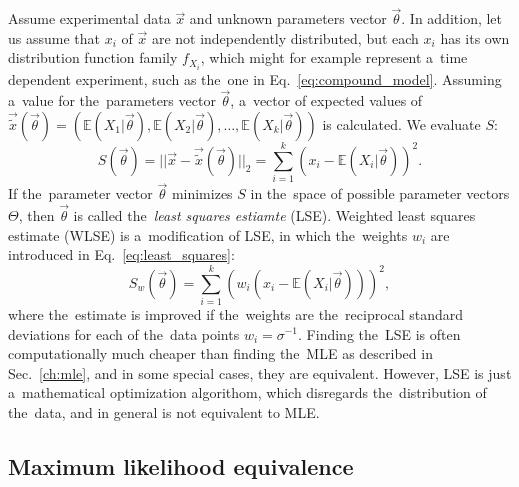 Assume experimental data $\vec{x}$ and unknown parameters vector $\vec{\theta}$. In addition, let us assume that $x_i$ of $\vec{x}$ are not independently distributed, but each $x_i$ has its own distribution function family $f_{X_i}$, which might for example represent a~time dependent experiment, such as the~one in Eq.~\ref{eq:compound_model}. Assuming a~value for the~parameters vector $\vec{{\theta}}$, a~vector of expected values of $\vec{\tilde{x}}(\vec{{\theta}}) = (\mathbb{E}(X_1|\vec{\theta}),\mathbb{E}(X_2|\vec{\theta}),\dots,\mathbb{E}(X_k|\vec{\theta}))$ is calculated. We evaluate $S$:
\begin{equation}
    S(\vec{{\theta}}) = || \vec{x} - \vec{\tilde{x}}(\vec{{\theta}}) ||_2 = \sum_{i=1}^{k} \left( x_i - \mathbb{E}(X_i|\vec{\theta}) \right)^2. \label{eq:least_squares}
\end{equation}
If the~parameter vector $\vec{{\theta}}$ minimizes $S$ in the~space of possible parameter vectors $\Theta$, then $\vec{{\theta}}$ is called the~\textit{least squares estiamte} (LSE). Weighted least squares estimate (WLSE) is a~modification of LSE, in which the~weights $w_i$ are introduced in Eq.~\ref{eq:least_squares}:
\begin{equation}
     S_w(\vec{{\theta}}) = \sum_{i=1}^{k} \left( w_i \left( x_i - \mathbb{E}(X_i|\vec{\theta}) \right) \right)^2, \label{eq:weighted_least_squares}
\end{equation}
where the~estimate is improved if the~weights are the~reciprocal standard deviations for each of the~data points $w_i = \sigma^{-1}$. Finding the~LSE is often computationally much cheaper than finding the~MLE as described in Sec.~\ref{ch:mle}, and in some special cases, they are equivalent. However, LSE is just a~mathematical optimization algorithom, which disregards the~distribution of the~data, and in general is not equivalent to MLE. 

\subsection{Maximum likelihood equivalence}

